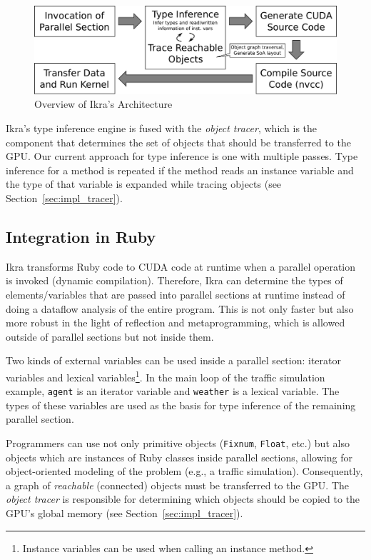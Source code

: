 \documentclass[preprint]{sigplanconf}
\begin{document}
\begin{figure}[!tp]
    \includegraphics[width=\columnwidth]{high_level_arch.pdf}
    \caption{Overview of Ikra's Architecture}
    \label{fig:overview_arch}
\end{figure}

Ikra's type inference engine is fused with the \emph{object tracer}, which is the component that determines the set of objects that should be transferred to the GPU. Our current approach for type inference is one with multiple passes. Type inference for a method is repeated if the method reads an instance variable and the type of that variable is expanded while tracing objects (see Section~\ref{sec:impl_tracer}).

\subsection{Integration in Ruby}
Ikra transforms Ruby code to CUDA code at runtime when a parallel operation is invoked (dynamic compilation). Therefore, Ikra can determine the types of elements/variables that are passed into parallel sections at runtime instead of doing a dataflow analysis of the entire program. This is not only faster but also more robust in the light of reflection and metaprogramming, which is allowed outside of parallel sections but not inside them.

Two kinds of external variables can be used inside a parallel section: iterator variables and lexical variables\footnote{Instance variables can be used when calling an instance method.}. In the main loop of the traffic simulation example, \texttt{agent} is an iterator variable and \texttt{weather} is a lexical variable. The types of these variables are used as the basis for type inference of the remaining parallel section.

Programmers can use not only primitive objects (\texttt{Fixnum}, \texttt{Float}, etc.) but also objects which are instances of Ruby classes inside parallel sections, allowing for object-oriented modeling of the problem (e.g., a traffic simulation). Consequently, a graph of \emph{reachable} (connected) objects must be transferred to the GPU. The \emph{object tracer} is responsible for determining which objects should be copied to the GPU's global memory (see Section~\ref{sec:impl_tracer}).
\end{document}
